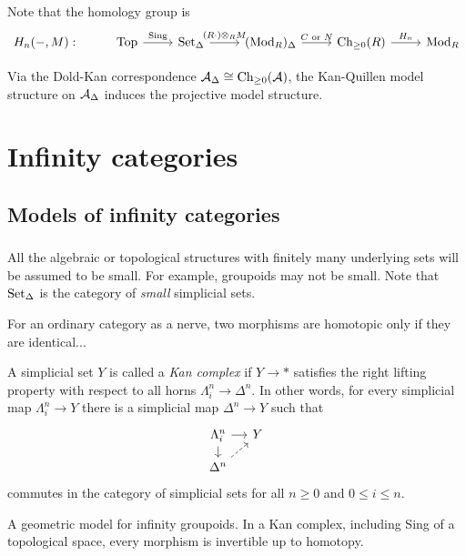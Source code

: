 \documentclass{../../large}
\begin{document}
Note that the homology group is
\[\begin{tikzcd}
H_n(-,M):&
\Top \rar{\Sing} &
\Set_\Delta \rar{(R\cdot)\otimes_RM} &
(\Mod_R)_\Delta \rar{C\text{ or }N} &
\Ch_{\ge0}(R) \rar{H_n} &
\Mod_R
\end{tikzcd}\]



\begin{prb}
\begin{parts}
\item Via the Dold-Kan correspondence $\mathcal{A}_\Delta\cong\operatorname{Ch}_{\ge0}(\mathcal{A})$, the Kan-Quillen model structure on $\mathcal{A}_\Delta$ induces the projective model structure.
\end{parts}
\end{prb}


\part{Infinity categories}
\chapter{Models of infinity categories}
\section{}

All the algebraic or topological structures with finitely many underlying sets will be assumed to be small.
For example, groupoids may not be small.
Note that $\operatorname{Set}_\Delta$ is the category of \emph{small} simplicial sets.

For an ordinary category as a nerve, two morphisms are homotopic only if they are identical...

\begin{prb}
A simplicial set $Y$ is called a \emph{Kan complex} if $Y\to*$ satisfies the right lifting property with respect to all horns $\Lambda_i^n\to\Delta^n$.
In other words, for every simplicial map $\Lambda_i^n\to Y$ there is a simplicial map $\Delta^n\to Y$ such that
\[\begin{tikzcd}[sep=small]
\Lambda_i^n \dar\rar & Y \\
\Delta^n \ar[dashed]{ur}
\end{tikzcd}\]
commutes in the category of simplicial sets for all $n\ge0$ and $0\le i\le n$.

A geometric model for infinity groupoids.
In a Kan complex, including Sing of a topological space, every morphism is invertible up to homotopy.
\end{prb}
\end{document}

